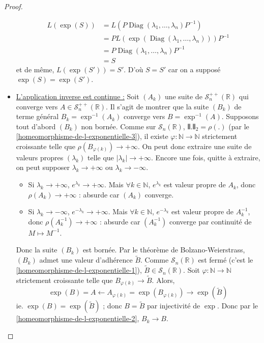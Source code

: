 \begin{proof}
\begin{itemize}
      \begin{align*}
        L(\exp(S)) &= L(P \operatorname{Diag}(\lambda_1, \dots, \lambda_n) P^{-1}) \\
        &= P L(\exp(\operatorname{Diag}(\lambda_1, \dots, \lambda_n))) P^{-1} \\
        &= P \operatorname{Diag}(\lambda_1, \dots, \lambda_n) P^{-1} \\
        &= S
      \end{align*}
      et de même, $L(\exp(S')) = S'$. D'où $S = S'$ car on a supposé $\exp(S) = \exp(S')$.
      \item \uline{L'application inverse est continue :} Soit $(A_k)$ une suite de $\mathcal{S}^{++}_n(\mathbb{R})$ qui converge vers $A \in \mathcal{S}^{++}_n(\mathbb{R})$. Il s'agit de montrer que la suite $(B_k)$ de terme général $B_k = \exp^{-1}(A_k)$ converge vers $B = \exp^{-1}(A)$. Supposons tout d'abord $(B_k)$ non bornée. Comme sur $\mathcal{S}_n(\mathbb{R})$, $\VERT . \VERT_2 = \rho(.)$ (par le \cref{homeomorphisme-de-l-exponentielle-3}), il existe $\varphi : \mathbb{N} \rightarrow \mathbb{N}$ strictement croissante telle que $\rho(B_{\varphi(k)}) \longrightarrow +\infty$. On peut donc extraire une suite de valeurs propres $(\lambda_k)$ telle que $|\lambda_k| \longrightarrow +\infty$. Encore une fois, quitte à extraire, on peut supposer $\lambda_k \longrightarrow +\infty$ ou $\lambda_k \longrightarrow -\infty$.
      \begin{itemize}
        \item Si $\lambda_k \longrightarrow +\infty$, $e^{\lambda_k} \longrightarrow +\infty$. Mais $\forall k \in \mathbb{N}$, $e^{\lambda_k}$ est valeur propre de $A_k$, donc $\rho(A_k) \longrightarrow +\infty$ : absurde car $(A_k)$ converge.
        \item Si $\lambda_k \longrightarrow -\infty$, $e^{-\lambda_k} \longrightarrow +\infty$. Mais $\forall k \in \mathbb{N}$, $e^{-\lambda_k}$ est valeur propre de $A_k^{-1}$, donc $\rho(A_k^{-1}) \longrightarrow +\infty$ : absurde car $(A_k^{-1})$ converge par continuité de $M \mapsto M^{-1}$.
      \end{itemize}
      Donc la suite $(B_k)$ est bornée. Par le théorème de Bolzano-Weierstrass, $(B_k)$ admet une valeur d'adhérence $\widetilde{B}$. Comme $\mathcal{S}_n(\mathbb{R})$ est fermé (c'est le \cref{homeomorphisme-de-l-exponentielle-1}), $\widetilde{B} \in \mathcal{S}_n(\mathbb{R})$.
      \newpar
      Soit $\varphi : \mathbb{N} \rightarrow \mathbb{N}$ strictement croissante telle que $B_{\varphi(k)} \longrightarrow \widetilde{B}$. Alors,
      \[ \exp(B) = A \longleftarrow A_{\varphi(k)} = \exp(B_{\varphi(k)}) \longrightarrow \exp(\widetilde{B}) \]
      ie. $\exp(B) = \exp(\widetilde{B})$ ; donc $B = \widetilde{B}$ par injectivité de $\exp$. Donc par le \cref{homeomorphisme-de-l-exponentielle-2}, $B_k \longrightarrow B$.
    \end{itemize}
  \end{proof}

